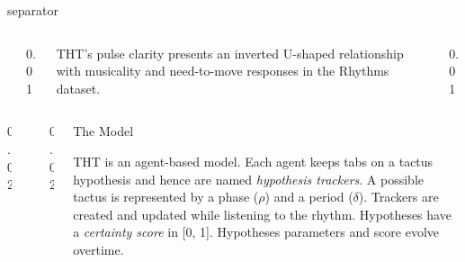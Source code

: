 \documentclass[final]{beamer}
\newlength{\sepwidth}
\newcommand{\separatorcolumn}[1][\sepwidth]{\begin{column}{#1}\end{column}}
\begin{document}
\begin{frame}[t]
\begin{beamercolorbox}[wd=\pagewidth]{separator}
\begin{columns}[T]
\begin{column}[t]{0.24\textwidth}

    \end{column}
        \separatorcolumn[0.01\textwidth]
        \begin{column}[t]{0.23\textwidth}
    THT's pulse clarity presents an inverted U-shaped relationship with
            musicality and need-to-move responses in the Rhythms dataset.

    \end{column}
    \separatorcolumn[0.01\textwidth]
    \end{columns}
    \vspace{6pt}
    \end{beamercolorbox}

    \begin{columns}[T]
    \separatorcolumn[0.02\textwidth]
    \begin{column}{0.02\textwidth}
        \vspace{14cm}
        {\color{darkgray} \huge {}}
    \end{column}
    \separatorcolumn[0.02\textwidth]
    \begin{column}{0.93\textwidth}
    \begin{column}{0.5\textwidth}
    \begin{block}{The Model}
        {\small
        THT is an agent-based model. Each agent keeps tabs on a tactus
        hypothesis and hence are named \emph{hypothesis trackers}. A possible
        tactus is represented by a phase ($\rho$) and a period ($\delta$).
        Trackers are created and updated while listening to the rhythm.
        Hypotheses have a \emph{certainty score} in [0, 1]. Hypotheses
        parameters and score evolve overtime.

        }


\end{block}
\end{column}
\end{column}
\end{columns}
\end{frame}
\end{document}
